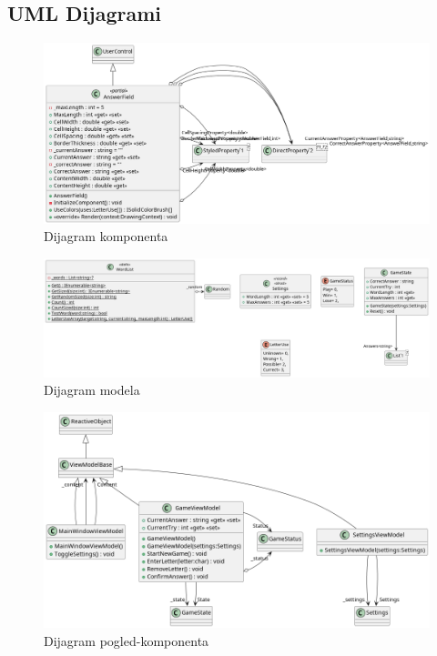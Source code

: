 \documentclass[12pt,a4paper]{report}
\begin{document}
\begin{landscape}
\chapter{UML Dijagrami}

\begin{figure}[!hp]
\centering
\vfill
\includegraphics[width=\textwidth,height=\textheight,keepaspectratio]{../PlantUML/Components/include.png}
\vfill
\caption{Dijagram komponenta}
\end{figure}
\newpage

\begin{figure}[p]
\centering
\vfill
\includegraphics[width=\textwidth,height=\textheight,keepaspectratio]{../PlantUML/Model/include.png}
\caption{Dijagram modela}
\vfill
\end{figure}
\newpage

\begin{figure}[p]
\centering
\vfill
\includegraphics[width=\textwidth,height=\textheight,keepaspectratio]{../PlantUML/ViewModels/include.png}
\caption{Dijagram pogled-komponenta}
\vfill
\end{figure}
\newpage


\end{landscape}
\end{document}
